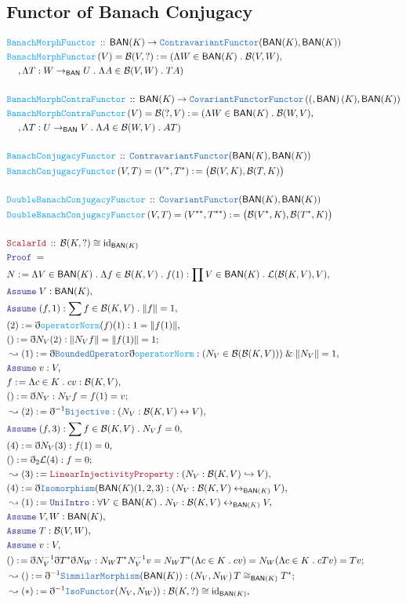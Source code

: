 \documentclass[12pt]{scrartcl}
\newcommand{\TYPE}[1]{\textcolor{NavyBlue}{\mathtt{#1}}}
\newcommand{\FUNC}[1]{\textcolor{Cerulean}{\mathtt{#1}}}
\newcommand{\LOGIC}[1]{\textcolor{Blue}{\mathtt{#1}}}
\newcommand{\THM}[1]{\textcolor{Maroon}{\mathtt{#1}}}
\renewcommand{\.}{\; . \;}
\newcommand{\de}{: \kern 0.1pc =}
\newcommand{\Act}[1]{\left( #1 \right)}
\newcommand{\Theorem}[2]{& \THM{#1} \, :: \, #2 \\ & \Proof = \\ }
\newcommand{\DeclareFunc}[2]{& \FUNC{#1} \, :: \, #2 \\}
\newcommand{\DefineNamedFunc}[4]{&  \FUNC{#1}\Act{#2} = #3 \de #4 \\}
\newcommand{\NewLine}{\\ & \kern 1pc}
\newcommand{\Page}[1]{\begin{align*} #1 \end{align*} \newpage   }
\newcommand{ \bd }{ \ByDef }
\renewcommand{\And}{\; \& \;}
\DeclareMathOperator*{\id}{id}
\newcommand{\Func}[2]{\TYPE{Functor}\left( #1, #2 \right)}
\newcommand{\ToInj}{\hookrightarrow}
\newcommand{\ToBij}{\leftrightarrow}
\newcommand{\Say}[3]{& #1 \de #2 : #3, \\}
\newcommand{\Conclude}[3]{& #1 \de #2 : #3; \\}
\newcommand{\Derive}[3]{& \leadsto #1 \de #2 : #3, \\}
\newcommand{\DeriveConclude}[3]{& \leadsto #1 \de #2 : #3 ; \\}
\newcommand{\A}{\LOGIC{Assume} \;}
\newcommand{\Assume}[2]{& \A #1 : #2, \\}
\newcommand{\ByDef}{\eth}
\newcommand{\Proof}{\LOGIC{Proof} \; }
\renewcommand{\L}{\mathcal{L}}
\newcommand{\BAN}{\textsf{BAN}}
\newcommand{\B}{\mathcal{B}}
\begin{document}
\subsection{Functor of Banach Conjugacy}
\Page{
\DeclareFunc{BanachMorphFunctor}{ \BAN(K) \to \TYPE{ContravariantFunctor}(\BAN(K),\BAN(K))}
\DefineNamedFunc{BanachMorphFunctor}{V}{\B(V,?)}
{ (\Lambda W \in \BAN(K) \. \B(V,W),
 \NewLine ,
 \Lambda T : W \to_{\BAN} U \. 
\Lambda A \in \B(V,W) \. TA) }
\\
\DeclareFunc{BanachMorphContraFunctor}{ \BAN(K) \to  \TYPE{CovariantFunctor}\Func(\BAN(K),\BAN(K))}
\DefineNamedFunc{BanachMorphContraFunctor}{V}{\B(?,V)}
{ (\Lambda W \in \BAN(K) \. \B(W,V),
 \NewLine ,
 \Lambda T : U \to_{\BAN} V \. 
\Lambda A \in \B(W,V) \. AT) }
\\
\DeclareFunc{BanachConjugacyFunctor}{ \TYPE{ContravariantFunctor}(\BAN(K),\BAN(K))}
\DefineNamedFunc{BanachConjugacyFunctor}{V,T}{(V^*,T^*)}{\big(\B(V,K), \B(T,K) \big)}
\\
\DeclareFunc{DoubleBanachConjugacyFunctor}{ \TYPE{CovariantFunctor}(\BAN(K),\BAN(K))}
\DefineNamedFunc{DoubleBanachConjugacyFunctor}{V,T}{(V^{**},T^{**})}{\big(\B(V^*,K), \B(T^*,K) \big)}
\\
\Theorem{ScalarId}{ \B(K, ?) \cong {  \id }_{\BAN(K)} }
\Say{N}{ \Lambda V \in \BAN(K) \. \Lambda f \in \B(K,V)  \. f(1) }{ \prod V \in \BAN(K) \. \L(\B(K,V),V)}
\Assume{V}{\BAN(K)}
\Assume{(f,1)}{\sum f \in \B(K,V) \. \| f \| = 1 }
\Say{(2)}{ \bd \FUNC{operatorNorm} (f)(1) }{ 1 = \| f(1) \|}
\Conclude{()}{\bd N_V(2)}{ \| N_V f \| = \| f(1) \| = 1 }
\Derive{(1)}{\bd \TYPE{BoundedOperator} \bd \FUNC{operatorNorm} }{(N_V \in \B(\B(K,V))) \And \| N_V \| = 1}
\Assume{v}{V}
\Say{f}{\Lambda c \in K \. cv}{\B(K,V)}
\Conclude{()}{\bd N_V}{N_Vf = f(1) = v}
\Derive{(2)}{ \bd^{-1} \TYPE{Bijective}}{(N_V : \B(K,V) \ToBij V)}
\Assume{(f,3)}{\sum f \in \B(K,V) \. N_Vf = 0  }
\Say{(4)}{ \bd N_V (3) }{ f(1) = 0}
\Conclude{()}{ \bd_2 \L (4)}{f = 0}
\Derive{(3)}{ \THM{LinearInjectivityProperty}}{ (N_V : \B(K,V) \ToInj V)}
\Say{(4)}{\bd \TYPE{Isomorphism}(\BAN(K)(1,2,3)}{(N_V : \B(K,V) \ToBij_{\BAN(K)} V)}
\Derive{(1)}{\LOGIC{UniIntro}}{ \forall V \in \BAN(K) \. N_V : \B(K,V) \ToBij_{\BAN(K)} V}
\Assume{V,W}{\BAN(K)}
\Assume{T}{\B(V,W)}
\Assume{v}{V}
\Conclude{()}{ \bd N^{-1}_V \bd T^* \bd N_W}{ N_WT^*N_V^{-1}v = N_WT^*(\Lambda c \in K \. cv) =  N_W (\Lambda c \in K \. cTv) = Tv}
\DeriveConclude{()}{\bd^{-1} \TYPE{SimmilarMorphism}(\BAN(K))}{(N_V,N_W) \,T \cong_{\BAN(K)} T^*}
\Derive{(*)}{\bd^{-1} \TYPE{IsoFunctor}(N_V,N_W))}{ \B(K, ?) \cong {  \id }_{\BAN(K)}}
} 
\end{document}

